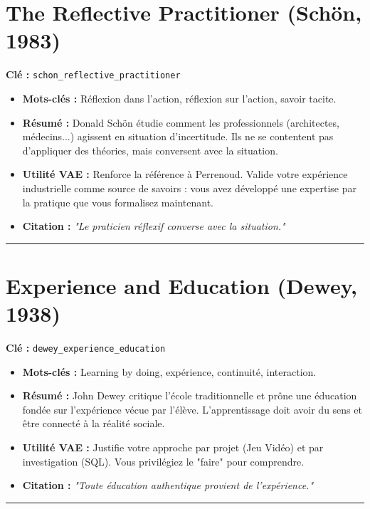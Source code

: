 \section{The Reflective Practitioner (Schön, 1983)}
\textbf{Clé :} \texttt{schon\_reflective\_practitioner}
\begin{itemize}
    \item \textbf{Mots-clés :} Réflexion dans l'action, réflexion sur l'action, savoir tacite.
    \item \textbf{Résumé :} Donald Schön étudie comment les professionnels (architectes, médecins...) agissent en situation d'incertitude. Ils ne se contentent pas d'appliquer des théories, mais conversent avec la situation.
    \item \textbf{Utilité VAE :} Renforce la référence à Perrenoud. Valide votre expérience industrielle comme source de savoirs : vous avez développé une expertise par la pratique que vous formalisez maintenant.
    \item \textbf{Citation :} \textit{"Le praticien réflexif converse avec la situation."}
\end{itemize}
\hrule

\section{Experience and Education (Dewey, 1938)}
\textbf{Clé :} \texttt{dewey\_experience\_education}
\begin{itemize}
    \item \textbf{Mots-clés :} Learning by doing, expérience, continuité, interaction.
    \item \textbf{Résumé :} John Dewey critique l'école traditionnelle et prône une éducation fondée sur l'expérience vécue par l'élève. L'apprentissage doit avoir du sens et être connecté à la réalité sociale.
    \item \textbf{Utilité VAE :} Justifie votre approche par projet (Jeu Vidéo) et par investigation (SQL). Vous privilégiez le "faire" pour comprendre.
    \item \textbf{Citation :} \textit{"Toute éducation authentique provient de l'expérience."}
\end{itemize}
\hrule

